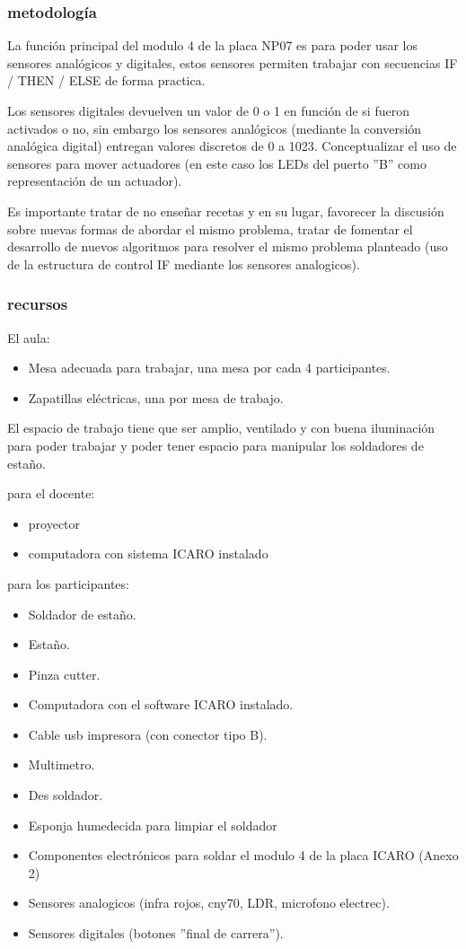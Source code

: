 \subsubsection{metodología}

La función principal del modulo 4 de la placa NP07 es para poder usar los sensores analógicos y digitales, estos sensores permiten trabajar con secuencias IF / THEN / ELSE de forma practica.

Los sensores digitales devuelven un valor de 0 o 1 en función de si fueron activados o no, sin embargo los sensores analógicos (mediante la conversión analógica digital) entregan valores discretos de 0 a 1023. Conceptualizar el uso de sensores para mover actuadores (en este caso los LEDs del puerto ''B'' como representación de un actuador).

Es importante tratar de no enseñar recetas y en su lugar, favorecer la discusión sobre nuevas formas de abordar el mismo problema, tratar de fomentar el desarrollo de nuevos algoritmos para resolver el mismo problema planteado (uso de la estructura de control IF mediante los sensores analogicos).

\subsubsection{recursos}
El aula:
\begin{itemize}
  \item Mesa adecuada para trabajar, una mesa por cada 4 participantes.
  \item Zapatillas eléctricas, una por mesa de trabajo.
\end{itemize}
El espacio de trabajo tiene que ser amplio, ventilado y con buena iluminación para poder trabajar y poder tener espacio para manipular los soldadores de estaño.    

para el docente:
\begin{itemize}
  \item proyector
  \item computadora con sistema ICARO instalado
\end{itemize}
para los participantes:
\begin{itemize}
  \item Soldador de estaño.
  \item Estaño.
  \item Pinza cutter.
  \item Computadora con el software ICARO instalado.
  \item Cable usb impresora (con conector tipo B).
  \item Multimetro.
  \item Des soldador.
  \item Esponja humedecida para limpiar el soldador
  \item Componentes electrónicos para soldar el modulo 4 de la placa ICARO (Anexo 2) 
  \item Sensores analogicos (infra rojos, cny70, LDR, microfono electrec).
  \item Sensores digitales (botones ''final de carrera'').
  
\end{itemize}

